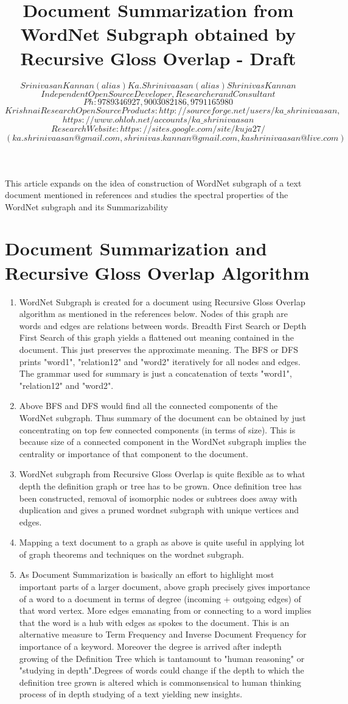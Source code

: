 \documentclass[11pt,onecolumn]{article}
\author{ $Srinivasan Kannan (alias) Ka.Shrinivaasan (alias) Shrinivas Kannan$ \\
$Independent Open Source Developer, Researcher and Consultant$ \\
$Ph: 9789346927, 9003082186, 9791165980$ \\
$Krishna iResearch OpenSource Products: http://sourceforge.net/users/ka\_shrinivaasan,$ \\ $https://www.ohloh.net/accounts/ka\_shrinivaasan$ \\
$Research Website: https://sites.google.com/site/kuja27/$ \\
$(ka.shrinivaasan@gmail.com, shrinivas.kannan@gmail.com, kashrinivaasan@live.com)$ 
}
\title{Document Summarization from WordNet Subgraph obtained by Recursive Gloss Overlap - Draft}
\begin{document}
\thispagestyle{empty}
\pagestyle{empty}
\maketitle
\begin{onecolabstract}
This article expands on the idea of construction of WordNet subgraph of a text document  mentioned in references and studies the spectral properties of the WordNet subgraph and its Summarizability
\end{onecolabstract}

\section{Document Summarization and Recursive Gloss Overlap Algorithm}
\begin{enumerate}
\item WordNet Subgraph is created for a document using Recursive Gloss Overlap algorithm as mentioned in the references below. Nodes of this graph are words and edges are relations between words. Breadth First Search or Depth First Search of this graph yields a flattened out meaning contained in the document. This just preserves the approximate meaning. The BFS or DFS prints "word1", "relation12" and "word2" iteratively for all nodes and edges. The grammar used for summary is just a concatenation of texts "word1", "relation12" and "word2".
\item Above BFS and DFS would find all the connected components of the WordNet subgraph. Thus summary of the document can be obtained by just concentrating on top few connected components (in terms of size). This is because size of a connected component in the WordNet subgraph implies the centrality or importance of that component to the document.
\item WordNet subgraph from Recursive Gloss Overlap is quite flexible as to what depth the definition graph or tree has to be grown. Once definition tree has been constructed, removal of isomorphic nodes or subtrees does away with duplication and gives a pruned wordnet subgraph with unique vertices and edges.
\item Mapping a text document to a graph as above is quite useful in applying lot of graph theorems and techniques on the wordnet subgraph.
\item As Document Summarization is basically an effort to highlight most important parts of a larger document, above graph precisely gives importance of a word to a document in terms of degree (incoming + outgoing edges) of that word vertex. More edges emanating from  or connecting to a word implies that the word is a hub with edges as spokes to the document. This is an alternative measure to Term Frequency and Inverse Document Frequency for importance of a keyword. Moreover the degree is arrived after indepth growing of the Definition Tree which is tantamount to "human reasoning" or "studying in depth".Degrees of words could change if the depth to which the definition tree grown is altered which is commonsensical to human thinking process of in depth studying of a text yielding new insights.

\end{enumerate}
\end{document}
